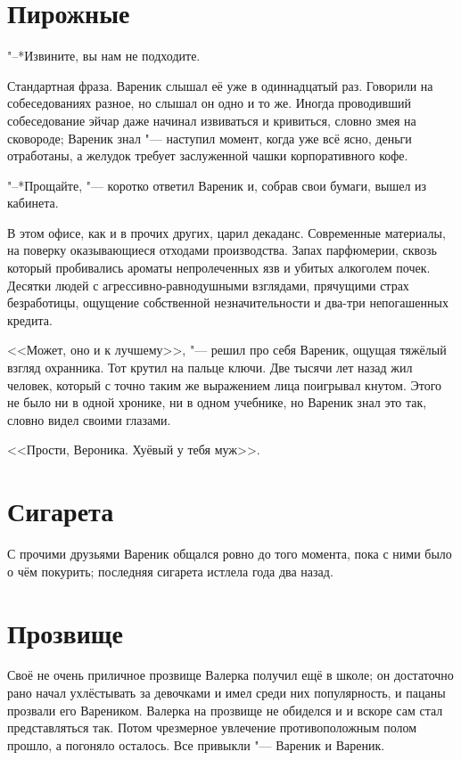 \section{Пирожные}

"--*Извините, вы нам не подходите.

Стандартная фраза.
Вареник слышал её уже в одиннадцатый раз.
Говорили на собеседованиях разное, но слышал он одно и то же.
Иногда проводивший собеседование эйчар даже начинал извиваться и кривиться, словно змея на сковороде;
Вареник знал "--- наступил момент, когда уже всё ясно, деньги отработаны, а желудок требует заслуженной чашки корпоративного кофе.

"--*Прощайте, "--- коротко ответил Вареник и, собрав свои бумаги, вышел из кабинета.

В этом офисе, как и в прочих других, царил декаданс.
Современные материалы, на поверку оказывающиеся отходами производства.
Запах парфюмерии, сквозь который пробивались ароматы непролеченных язв и убитых алкоголем почек.
Десятки людей с агрессивно-равнодушными взглядами, прячущими страх безработицы, ощущение собственной незначительности и два-три непогашенных кредита.

<<Может, оно и к лучшему>>, "--- решил про себя Вареник, ощущая тяжёлый взгляд охранника.
Тот крутил на пальце ключи.
Две тысячи лет назад жил человек, который с точно таким же выражением лица поигрывал кнутом.
Этого не было ни в одной хронике, ни в одном учебнике, но Вареник знал это так, словно видел своими глазами.

<<Прости, Вероника.
Хуёвый у тебя муж>>.

\section{Сигарета}

С прочими друзьями Вареник общался ровно до того момента, пока с ними было о чём покурить;
последняя сигарета истлела года два назад. 

\section{Прозвище}

Своё не очень приличное прозвище Валерка получил ещё в школе;
он достаточно рано начал ухлёстывать за девочками и имел среди них популярность, и пацаны прозвали его Вареником.
Валерка на прозвище не обиделся и и вскоре сам стал представляться так.
Потом чрезмерное увлечение противоположным полом прошло, а погоняло осталось.
Все привыкли "--- Вареник и Вареник.

